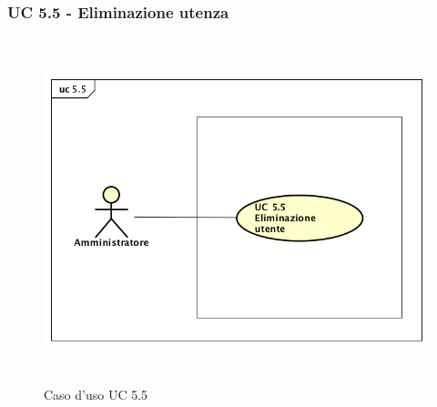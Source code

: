 %
%
%
%
%
%
%
%
%
%
%
%
%
%
%
%
%
%
%


\subsubsection{UC 5.5 - Eliminazione utenza}
\begin{figure}[H]
\centering
\includegraphics[width=17cm, height=10cm]{img/UC55.png} 
\caption{Caso d'uso UC 5.5}
\end{figure}
